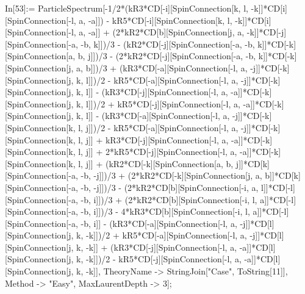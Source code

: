 In[53]:= ParticleSpectrum[-1/2*(kR3*CD[-i][SpinConnection[k, l, -k]]*CD[i][SpinConnection[-l, a, -a]]) - kR5*CD[-i][SpinConnection[k, l, -k]]*CD[i][SpinConnection[-l, a, -a]] + (2*kR2*CD[b][SpinConnection[j, a, -k]]*CD[-j][SpinConnection[-a, -b, k]])/3 - (kR2*CD[-j][SpinConnection[-a, -b, k]]*CD[-k][SpinConnection[a, b, j]])/3 - (2*kR2*CD[-j][SpinConnection[-a, -b, k]]*CD[-k][SpinConnection[j, a, b]])/3 + (kR3*CD[-a][SpinConnection[-l, a, -j]]*CD[-k][SpinConnection[j, k, l]])/2 - kR5*CD[-a][SpinConnection[-l, a, -j]]*CD[-k][SpinConnection[j, k, l]] - (kR3*CD[-j][SpinConnection[-l, a, -a]]*CD[-k][SpinConnection[j, k, l]])/2 + kR5*CD[-j][SpinConnection[-l, a, -a]]*CD[-k][SpinConnection[j, k, l]] - (kR3*CD[-a][SpinConnection[-l, a, -j]]*CD[-k][SpinConnection[k, l, j]])/2 - kR5*CD[-a][SpinConnection[-l, a, -j]]*CD[-k][SpinConnection[k, l, j]] + kR3*CD[-j][SpinConnection[-l, a, -a]]*CD[-k][SpinConnection[k, l, j]] + 2*kR5*CD[-j][SpinConnection[-l, a, -a]]*CD[-k][SpinConnection[k, l, j]] + (kR2*CD[-k][SpinConnection[a, b, j]]*CD[k][SpinConnection[-a, -b, -j]])/3 + (2*kR2*CD[-k][SpinConnection[j, a, b]]*CD[k][SpinConnection[-a, -b, -j]])/3 - (2*kR2*CD[b][SpinConnection[-i, a, l]]*CD[-l][SpinConnection[-a, -b, i]])/3 + (2*kR2*CD[b][SpinConnection[-i, l, a]]*CD[-l][SpinConnection[-a, -b, i]])/3 - 4*kR3*CD[b][SpinConnection[-i, l, a]]*CD[-l][SpinConnection[-a, -b, i]] - (kR3*CD[-a][SpinConnection[-l, a, -j]]*CD[l][SpinConnection[j, k, -k]])/2 + kR5*CD[-a][SpinConnection[-l, a, -j]]*CD[l][SpinConnection[j, k, -k]] + (kR3*CD[-j][SpinConnection[-l, a, -a]]*CD[l][SpinConnection[j, k, -k]])/2 - kR5*CD[-j][SpinConnection[-l, a, -a]]*CD[l][SpinConnection[j, k, -k]], TheoryName -> StringJoin["Case", ToString[11]], Method -> "Easy", MaxLaurentDepth -> 3]; 